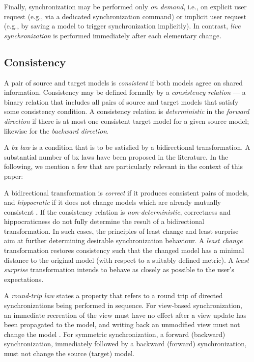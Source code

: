 Finally, synchronization may be performed only \emph{on demand}, i.e., on explicit user request (e.g., via a dedicated synchronization command) or implicit user request (e.g., by saving a model to trigger synchronization implicitly).
In contrast, \emph{live synchronization} is performed immediately after each elementary change.  

\subsection{Consistency}
\label{sec:Consistency}

A pair of source and target models is \emph{consistent} if both models agree on shared information. Consistency may be defined formally by a \emph{consistency relation} --- a binary relation that includes all pairs of source and target models that satisfy some consistency condition. A consistency relation is \emph{deterministic} in the \emph{forward direction} if there is at most one consistent target model for a given source model; likewise for the \emph{backward direction}. 

A \emph{bx law} is a condition that is to be satisfied by a bidirectional transformation. 
A substantial number of bx laws have been proposed in the literature. 
In the following, we mention a few that are particularly relevant in the context of this paper: 

A bidirectional transformation is \emph{correct} if it produces consistent pairs of models, and \emph{hippocratic} if it does not change models which are already mutually consistent \cite{SOSYM-Stevens2010}. 
If the consistency relation is \emph{non-deter\-min\-is\-tic}, correctness and hippocraticness do not fully determine the result of a bidirectional transformation. 
In such cases, the principles of least change and least surprise aim at further determining desirable synchronization behaviour. 
A \emph{least change} transformation \cite{SOSYM-Macedo2016} restores consistency such that the changed model has a minimal distance to the original model (with respect to a suitably defined metric). 
A \emph{least surprise} transformation \cite{Cheney2015} intends to behave as closely as possible to the user's expectations.

A \emph{round-trip law} states a property that refers to a round trip of directed synchronizations being performed in sequence. 
For view-based synchronization, an immediate recreation of the view must have no effect after a view update has been propagated to the model, and writing back an unmodified view must not change the model \cite{TOPLAS2007-Foster}. 
For symmetric synchronization, a forward (backward) synchronization, immediately followed by a backward (forward) synchronization, must not change the source (target) model.

